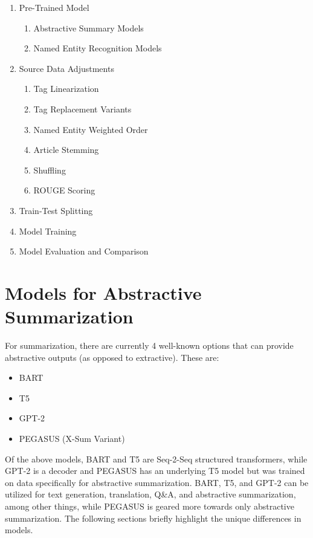 \documentclass[12pt]{report}
\begin{document}
        \begin{enumerate}
            \item Pre-Trained Model
            \begin{enumerate}
                \item Abstractive Summary Models
                \item Named Entity Recognition Models
            \end{enumerate}

            \item Source Data Adjustments
            \begin{enumerate}
                \item Tag Linearization
                \item Tag Replacement Variants
                \item Named Entity Weighted Order
                \item Article Stemming
                \item Shuffling
                \item ROUGE Scoring
            \end{enumerate}
            \item Train-Test Splitting
            \item Model Training
            \item Model Evaluation and Comparison
            
        \end{enumerate}
    
    \section{Models for Abstractive Summarization}
        For summarization, there are currently 4 well-known options that can provide abstractive outputs (as opposed to extractive). These are:
            
        \begin{itemize}
            \item BART~\cite{BART}
            \item T5~\cite{T5}
            \item GPT-2~\cite{GPT2}
            \item PEGASUS (X-Sum Variant)~\cite{PEGASUS}
        \end{itemize}
        
        Of the above models, BART and T5 are Seq-2-Seq structured transformers, while GPT-2 is a decoder and PEGASUS has an underlying T5 model but was trained on data specifically for abstractive summarization. BART, T5, and GPT-2 can be utilized for text generation, translation, Q\&A, and abstractive summarization, among other things, while PEGASUS is geared more towards only abstractive summarization. The following sections briefly highlight the unique differences in models.
        
\end{document}

